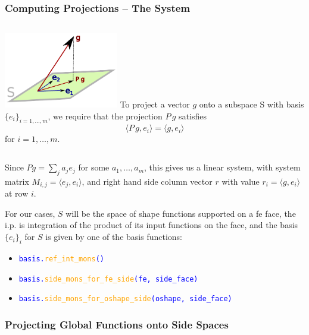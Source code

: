 \documentclass[compress]{beamer}
\begin{document}
\begin{frame}
  \frametitle{Computing Projections -- The System}
  \begin{columns}
      \includegraphics[width=5cm, height=3.33cm]{img/projection.pdf}
      To project a vector $g$ onto a subspace S with basis $\{e_i\}_{i=1,\dots,m}$, we require that the projection
      $P\,g$ satisfies
      $$\langle P\,g, e_i \rangle = \langle g, e_i \rangle$$ for $i=1,\dots,m$.
  \end{columns}
  \pause

  Since $P g = \sum_j{ a_j e_j }$ for some $a_1,\dots,a_m$, this gives us a linear system, with system matrix
  $M_{i,j} = \langle e_j, e_i \rangle$, and right hand side column vector $r$ with value
  $r_i = \langle g, e_i \rangle$ at row $i$.
  \pause
 
  For our cases, $S$ will be the space of shape functions supported on a fe face, the i.p. is integration of the product
  of its input functions on the face, and the basis $\{e_i\}_i$ for $S$ is given by one of the basis functions:
  \pause
  \begin{itemize}[<+->]
    \item \texttt{\textcolor{blue}{basis.\textcolor{orange}{ref\_int\_mons}()}} 
    \item \texttt{\textcolor{blue}{basis.\textcolor{orange}{side\_mons\_for\_fe\_side}(fe, side\_face)}}
    \item \texttt{\textcolor{blue}{basis.\textcolor{orange}{side\_mons\_for\_oshape\_side}(oshape, side\_face)}}
  \end{itemize}
\end{frame}

\subsubsection{Projecting Global Functions onto Side Spaces}
\end{document}
